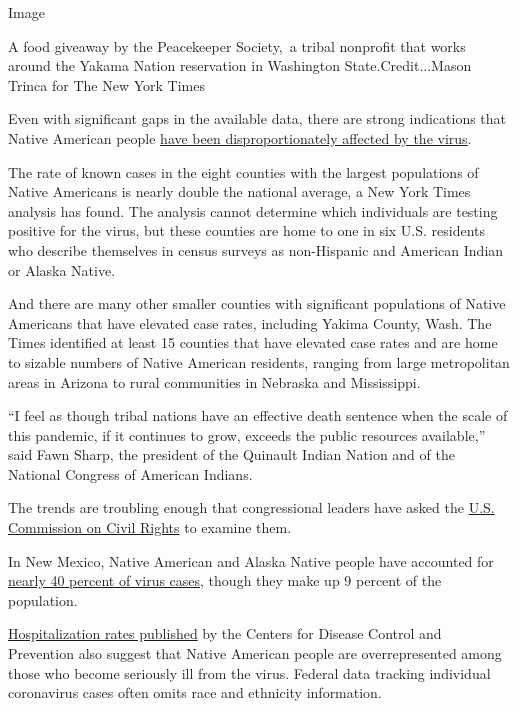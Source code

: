 Image

A food giveaway by the Peacekeeper Society,~a tribal nonprofit that
works around the Yakama Nation reservation in Washington
State.Credit...Mason Trinca for The New York Times

Even with significant gaps in the available data, there are strong
indications that Native American people
\href{https://www.nytimes.com/2020/07/30/us/native-americans-coronavirus-data.html}{have
been disproportionately affected by the virus}.

The rate of known cases in the eight counties with the largest
populations of Native Americans is nearly double the national average, a
New York Times analysis has found. The analysis cannot determine which
individuals are testing positive for the virus, but these counties are
home to one in six U.S. residents who describe themselves in census
surveys as non-Hispanic and American Indian or Alaska Native.

And there are many other smaller counties with significant populations
of Native Americans that have elevated case rates, including Yakima
County, Wash. The Times identified at least 15 counties that have
elevated case rates and are home to sizable numbers of Native American
residents, ranging from large metropolitan areas in Arizona to rural
communities in Nebraska and Mississippi.

``I feel as though tribal nations have an effective death sentence when
the scale of this pandemic, if it continues to grow, exceeds the public
resources available,'' said Fawn Sharp, the president of the Quinault
Indian Nation and of the National Congress of American Indians.

The trends are troubling enough that congressional leaders have asked
the
\href{https://www.warren.senate.gov/newsroom/press-releases/us-commission-on-civil-rights-agrees-to-warren-haaland-request-to-update-broken-promises-report-and-examine-pandemic-impacts-on-indian-country}{U.S.
Commission on Civil Rights} to examine them.

In New Mexico, Native American and Alaska Native people have accounted
for \href{https://cvprovider.nmhealth.org/public-dashboard.html}{nearly
40 percent of virus cases,} though they make up 9 percent of the
population.

\href{https://www.cdc.gov/coronavirus/2019-ncov/covid-data/covidview/index.html}{Hospitalization
rates published} by the Centers for Disease Control and Prevention also
suggest that Native American people are overrepresented among those who
become seriously ill from the virus. Federal data tracking individual
coronavirus cases often omits race and ethnicity information.

